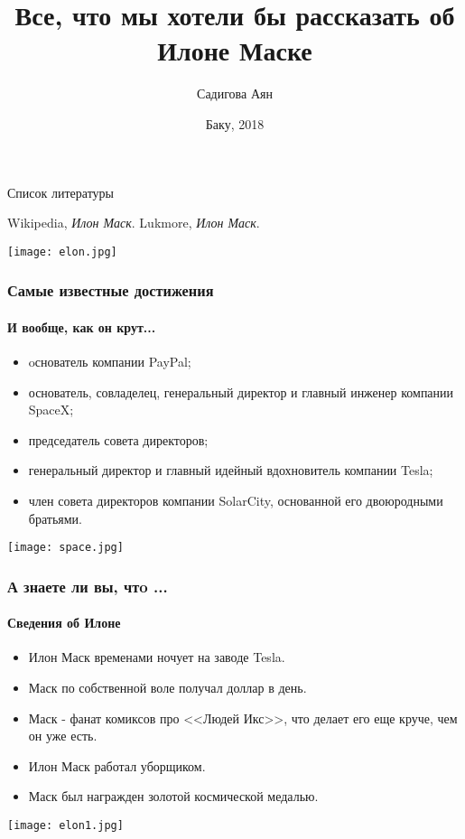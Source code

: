\documentclass{beamer}
\begin{document}
\title{Все, что мы хотели бы рассказать об Илоне Маске}  
\author{Садигова Аян}
\date{Баку, 2018} 
\frame{\titlepage} 

\begin{frame}{Список литературы}
\begin{thebibliography}{10}
\beamertemplatebookbibitems
{}
{\sc Wikipedia}, {\em Илон Маск}.
{\sc Lukmore}, {\em Илон Маск}.
\end{thebibliography}
\centering\texttt{[image: elon.jpg]}\par
\end{frame}

\begin{frame}
\frametitle{Самые известные достижения}
\framesubtitle{И вообще, как он крут...}
\begin{itemize}
 \item oснователь компании PayPal;
 \item основатель, совладелец, генеральный директор и главный инженер компании SpaceX;
 \item председатель совета директоров;
 \item генеральный директор и главный идейный вдохновитель компании Tesla;
 \item член совета директоров компании SolarCity, основанной его двоюродными братьями.
\end{itemize}
\centering\texttt{[image: space.jpg]}\par
\end{frame}

\begin{frame}
\frametitle{А знаете ли вы, чтo ...}
\framesubtitle{Сведения об Илоне}
\begin{itemize}
 \item Илон Маск временами ночует на заводе Tesla.
 \item Маск по собственной воле получал доллар в день.
 \item Маск - фанат комиксов про <<Людей Икс>>, что делает его еще круче, чем он уже есть.
 \item Илон Маск работал уборщиком.
 \item Маск был награжден золотой космической медалью.
\end{itemize}
\centering\texttt{[image: elon1.jpg]}\par
\end{frame}
\end{document}
